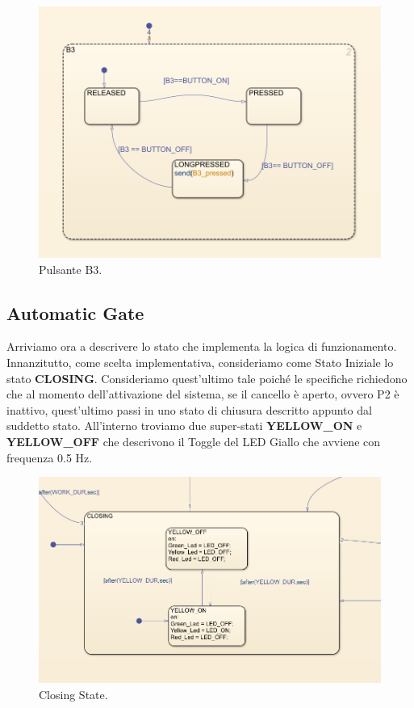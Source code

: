 \documentclass[12pt]{article}
\begin{document}
\begin{figure}[H]
    \centering
    \includegraphics[width=1\textwidth]{Immagini_State_Flow/Pulsante_B3.png}
    \caption{Pulsante B3.}
\end{figure}

\subsection{Automatic Gate}

Arriviamo ora a descrivere lo stato che implementa la logica di funzionamento. Innanzitutto, come scelta implementativa, consideriamo come Stato Iniziale lo stato \textbf{CLOSING}. Consideriamo quest'ultimo tale poiché le specifiche richiedono che al momento dell'attivazione del sistema, se il cancello è aperto, ovvero P2 è inattivo, quest'ultimo passi in uno stato di chiusura descritto appunto dal suddetto stato. All'interno troviamo due super-stati \textbf{YELLOW\_ON} e \textbf{YELLOW\_OFF} che descrivono il Toggle del LED Giallo che avviene con frequenza 0.5 Hz.

\begin{figure}[H]
    \centering
    \includegraphics[width=1\textwidth]{Immagini_State_Flow/Closing.png}
    \caption{Closing State.}
\end{figure}
\end{document}
